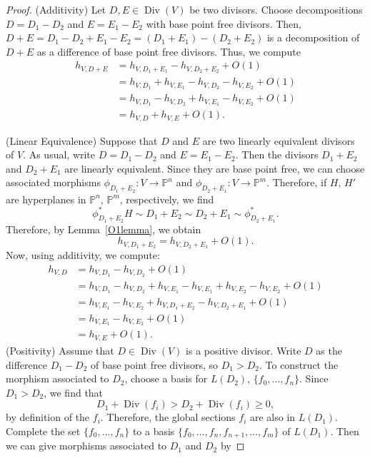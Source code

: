 \documentclass[a4paper, 12pt]{amsart}
\theoremstyle{definition}
\theoremstyle{plain}
\theoremstyle{plain}
\theoremstyle{plain}
\theoremstyle{plain}
\theoremstyle{remark}
\theoremstyle{remark}
\theoremstyle{plain}
\newcommand{\lemref}[1]{Lemma~\ref{#1}}
\DeclareMathOperator{\Div}{Div}
\begin{document}
\begin{proof}
		(Additivity) Let $D,E\in\Div(V)$ be two divisors. Choose decompositions $D=D_1-D_2$ and $E=E_1-E_2$ with base point free divisors. Then, $D+E=D_1-D_2+E_1-E_2=(D_1+E_1)-(D_2+E_2)$ is a decomposition of $D+E$ as a difference of base point free divisors. Thus, we compute
		\begin{align*}
			h_{V,D+E}&=h_{V,D_1+E_1}-h_{V,D_2+E_2}+O(1)\\
			&=h_{V,D_1}+h_{V,E_1}-h_{V,D_2}-h_{V,E_2}+O(1)\\
			&=h_{V,D_1}-h_{V,D_2}+h_{V,E_1}-h_{V,E_2}+O(1)\\
			&=h_{V,D}+h_{V,E}+O(1).
		\end{align*}
		
		(Linear Equivalence) Suppose that $D$ and $E$ are two linearly equivalent divisors of $V$. As usual, write $D=D_1-D_2$ and $E=E_1-E_2$. Then the divisors $D_1+E_2$ and $D_2+E_1$ are linearly equivalent. Since they are base point free, we can choose associated morphisms $\phi_{D_1+E_2}:V\rightarrow\mathbb{P}^n$ and $\phi_{D_2+E_1}:V\rightarrow\mathbb{P}^m$. Therefore, if $H$, $H'$ are hyperplanes in $\mathbb{P}^n$, $\mathbb{P}^m$, respectively, we find
		\begin{equation*}
			\phi_{D_1+E_2}^*H\sim D_1+E_2\sim D_2+E_1\sim\phi_{D_2+E_1}^*.
		\end{equation*}
		Therefore, by \lemref{O1lemma}, we obtain
		\begin{equation*}
			h_{V,D_1+E_2}=h_{V,D_2+E_1}+O(1).
		\end{equation*}
		Now, using additivity, we compute:
		\begin{align*}
			h_{V,D}&=h_{V,D_1}-h_{V,D_2}+O(1)\\
			&=h_{V,D_1}-h_{V,D_2}+h_{V,E_1}-h_{V,E_1}+h_{V,E_2}-h_{V,E_2}+O(1)\\
			&=h_{V,E_1}-h_{V,E_2}+h_{V,D_1+E_2}-h_{V,D_2+E_1}+O(1)\\
			&=h_{V,E_1}-h_{V,E_2}+O(1)\\
			&=h_{V,E}+O(1).
		\end{align*}
		(Positivity) Assume that $D\in\Div(V)$ is a positive divisor. Write $D$ as the difference $D_1-D_2$ of base point free divisors, so $D_1>D_2$. To construct the morphism associated to $D_2$, choose a basis for $L(D_2)$, $\{f_0,\ldots,f_n\}$. Since $D_1>D_2$, we find that
		\begin{equation*}
			D_1+\Div(f_i)>D_2+\Div(f_i)\ge 0,
		\end{equation*}
		by definition of the $f_i$. Therefore, the global sections $f_i$ are also in $L(D_1)$. Complete the set $\{f_0,\ldots,f_n\}$ to a basis $\{f_0,\ldots,f_n,f_{n+1},\ldots, f_m\}$ of $L(D_1)$. Then we can give morphisms associated to $D_1$ and $D_2$ by

\end{proof}
\end{document}
